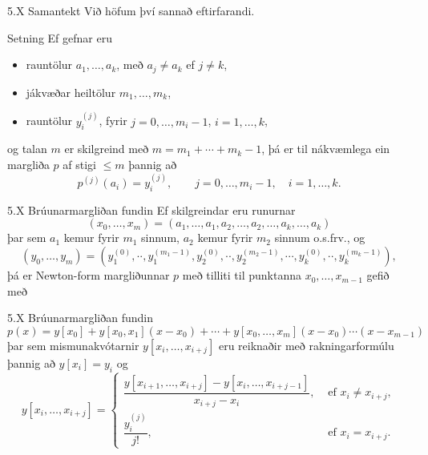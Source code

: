 \begin{frame}{5.X Samantekt} 
Við höfum því sannað eftirfarandi.
\pause
\begin{block}{Setning}
Ef gefnar eru 
\begin{itemize}
 \item rauntölur $a_1,\dots,a_k$, með $a_j\neq a_k$ ef $j\neq k$, 
 \item jákvæðar heiltölur $m_1,\dots,m_k$,  
 \item rauntölur $y_i^{(j)}$, fyrir $j=0,\dots, m_i-1$, $i=1,\dots,k$, 
\end{itemize}
og talan $m$ er skilgreind
með $m=m_1+\cdots+m_k-1$, þá er til nákvæmlega ein margliða $p$
af stigi $\leq m$ þannig að
$$
p^{(j)}(a_i)=y_i^{(j)}, \qquad j=0,\dots, m_i-1, \quad i=1,\dots,k. 
$$  
\end{block}
\end{frame}

\begin{frame}{5.X Brúunarmargliðan fundin}
Ef skilgreindar eru runurnar 
$$
(x_0,\dots,x_m)=(a_1,\dots,a_1,a_2,\dots,a_2,\dots,a_k,\dots,a_k)
$$
þar sem $a_1$ kemur fyrir $m_1$ sinnum, $a_2$ kemur fyrir $m_2$ sinnum
o.s.frv., og
$$
(y_0,\dots,y_m)=(y_1^{(0)},\cdot\cdot,y_1^{(m_1-1)},y_2^{(0)},\cdot\cdot,y_2^{(m_2-1)},
\cdots,y_k^{(0)},\cdot\cdot,y_k^{(m_k-1)}),
$$
þá er Newton-form margliðunnar $p$ með tilliti til punktanna
$x_0,\dots,x_{m-1}$ gefið með 
\end{frame}

\begin{frame}{5.X Brúunarmargliðan fundin} 
$$
p(x)=y[x_0]+y[x_0,x_1](x-x_0)+\cdots+y[x_0,\dots,x_m](x-x_0)\cdots(x-x_{m-1})
$$
þar sem mismunakvótarnir $y[x_i,\ldots,x_{i+j}]$  eru reiknaðir með
rakningarformúlu þannig að $y[x_i]=y_i$ og
$$
  y[x_i,\ldots,x_{i+j}]
  = \begin{cases}\dfrac{y[x_{i+1},\ldots,x_{i+j}] - y[x_i,\ldots,x_{i+j-1}]}
  {x_{i+j} - x_i}, &\text{ ef } x_i\neq x_{i+j},\\
\dfrac{y^{(j)}_i}{j!}, &\text{ ef } x_i=x_{i+j}.
\end{cases}
$$
\end{frame}


